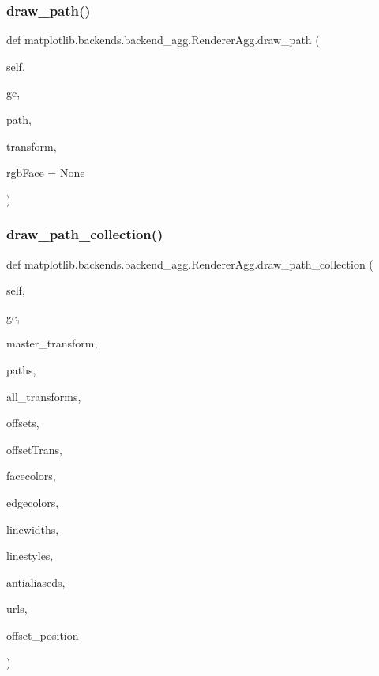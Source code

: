 \subsubsection{\texorpdfstring{draw\+\_\+path()}{draw\_path()}}
{\footnotesize\ttfamily def matplotlib.\+backends.\+backend\+\_\+agg.\+Renderer\+Agg.\+draw\+\_\+path (\begin{DoxyParamCaption}\item[{}]{self,  }\item[{}]{gc,  }\item[{}]{path,  }\item[{}]{transform,  }\item[{}]{rgb\+Face = {\ttfamily None} }\end{DoxyParamCaption})}

\mbox{\label{classmatplotlib_1_1backends_1_1backend__agg_1_1RendererAgg_a14af95dabc9f6fecaffc07d33d4014a4}} 
\subsubsection{\texorpdfstring{draw\+\_\+path\+\_\+collection()}{draw\_path\_collection()}}
{\footnotesize\ttfamily def matplotlib.\+backends.\+backend\+\_\+agg.\+Renderer\+Agg.\+draw\+\_\+path\+\_\+collection (\begin{DoxyParamCaption}\item[{}]{self,  }\item[{}]{gc,  }\item[{}]{master\+\_\+transform,  }\item[{}]{paths,  }\item[{}]{all\+\_\+transforms,  }\item[{}]{offsets,  }\item[{}]{offset\+Trans,  }\item[{}]{facecolors,  }\item[{}]{edgecolors,  }\item[{}]{linewidths,  }\item[{}]{linestyles,  }\item[{}]{antialiaseds,  }\item[{}]{urls,  }\item[{}]{offset\+\_\+position }\end{DoxyParamCaption})}

